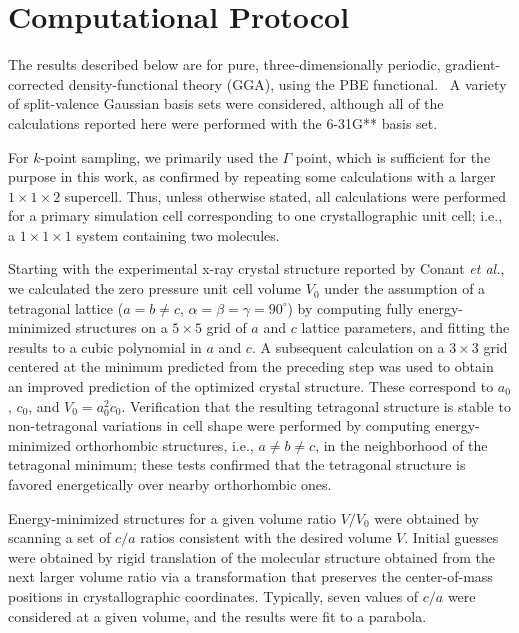 \documentclass[prb,aps,nobibnotes,twocolumn,doublespace,twocolumngrid,superbib]{revtex4}
\begin{document}
\section{Computational Protocol}
\label{sec:protocol}
The results described below are for pure, three-dimensionally periodic,
gradient-corrected density-functional theory (GGA), using the PBE
functional.~\cite{Perdew_96v77} A variety of split-valence Gaussian
basis sets were considered, although all of the calculations reported
here were performed with the 6-31G** basis set.

For $k$-point sampling, we primarily used the $\Gamma$ point, which is
sufficient for the purpose in this work, as confirmed by repeating
some calculations with a larger $1 \times 1 \times 2 $ supercell.
Thus, unless otherwise stated, all calculations were performed for a
primary simulation cell corresponding to one crystallographic unit
cell; i.e., a $1\times 1\times 1 $ system containing two molecules.

Starting with the experimental x-ray crystal structure reported by
Conant {\it et al.},~\cite{Conant_1979} we calculated the zero
pressure unit cell volume $V_0$ under the assumption of a tetragonal
lattice ($a=b\neq c$, $\alpha=\beta=\gamma=90^\circ$) by computing
fully energy-minimized structures on a $5\times 5$ grid of $a$ and $c$
lattice parameters, and fitting the results to a cubic polynomial in
$a$ and $c$.  A subsequent calculation on a $3 \times 3$ grid centered
at the minimum predicted from the preceding step was used to obtain an
improved prediction of the optimized crystal structure.  These
correspond to $a_0$, $c_0$, and $V_0=a_0^2c_0$.  Verification that the
resulting tetragonal structure is stable to non-tetragonal variations
in cell shape were performed by computing energy-minimized
orthorhombic structures, i.e., $a\neq b\neq c$, in the neighborhood of
the tetragonal minimum; these tests confirmed that the tetragonal
structure is favored energetically over nearby orthorhombic ones.

Energy-minimized structures for a given volume ratio $V/V_0$ were
obtained by scanning a set of $c/a$ ratios consistent with the desired
volume $V$.  Initial guesses were obtained by rigid translation of the
molecular structure obtained from the next larger volume ratio via a
transformation that preserves the center-of-mass positions in
crystallographic coordinates.  Typically, seven values of $c/a$ were
considered at a given volume, and the results were fit to a parabola.
\end{document}
